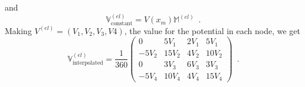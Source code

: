 \documentclass[12pt,letterpaper,final]{article}
\begin{document}
and 
 \[\mathbb{V}_{\text{constant}}^{(el)} = V(x_m) \mathbb{M}^{(el)} \enspace .\]
Making ${V}^{(el)} = (V_1,V_2,V_3,V4)$, the value for the potential in each node, we get
\[\mathbb{V}_{\text{interpolated}}^{(el)} = \frac{1}{360}  \begin{pmatrix}
   0    & 5V_1  & 2V_1 & 5V_1 \\
  -5V_2 & 15V_2 & 4V_2 & 10V_2 \\
   0    & 3V_3  & 6V_3 & 3V_3  \\
  -5V_4 & 10V_4 & 4V_4 & 15V_4 
 \end{pmatrix} \enspace . \]
 

\end{document}
